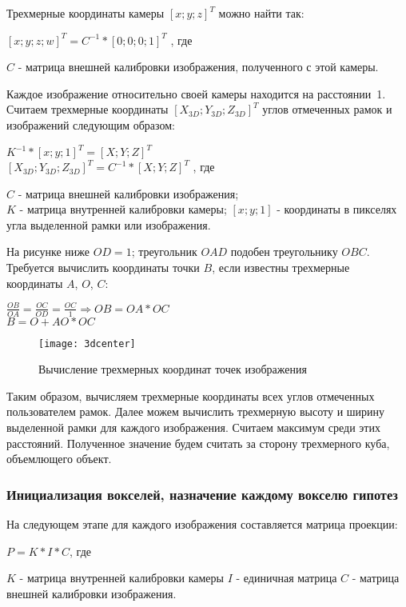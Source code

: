 Трехмерные координаты камеры $[x;y;z]^T$ можно найти так:

\begin{center}
	$[x;y;z;w]^T = C^{-1}*[0;0;0;1]^T$ , где
\end{center}
$C$ - матрица внешней калибровки изображения, полученного с этой камеры.

Каждое изображение относительно своей камеры находится на расстоянии~1. Считаем трехмерные координаты $[X_{3D};Y_{3D};Z_{3D}]^T$ углов отмеченных рамок и изображений следующим образом:

\begin{center}
	$K^{-1}*[x;y;1]^T = [X;Y;Z]^T$ \\
	$[X_{3D};Y_{3D};Z_{3D}]^T = C^{-1}*[X;Y;Z]^T$ , где
\end{center}
$C$ - матрица внешней калибровки изображения;\\
$K$ - матрица внутренней калибровки камеры;
$[x;y;1]$ - координаты в пикселях угла выделенной рамки или изображения.

На рисунке ниже $OD = 1$; треугольник ${OAD}$ подобен треугольнику ${OBC}$. Требуется вычислить координаты точки $B$, если известны трехмерные координаты $A$, $O$, $C$:

\begin{center}
	$\frac{OB}{OA} = \frac{OC}{OD} = \frac{OC}{1} \Rightarrow OB = OA*OC$ \\
	$B = O + AO*OC$
\end{center}

\begin{figure}[h]
\center
\texttt{[image: 3dcenter]}
\caption{Вычисление трехмерных координат точек изображения}
\end{figure}

Таким образом, вычисляем трехмерные координаты всех углов отмеченных пользователем рамок. Далее можем вычислить трехмерную высоту и ширину выделенной рамки для каждого изображения. Считаем максимум среди этих расстояний. Полученное значение будем считать за сторону трехмерного куба, объемлющего объект.

\subsubsection{Инициализация вокселей, назначение каждому вокселю гипотез}
На следующем этапе для каждого изображения составляется матрица проекции:

\begin{center}
	$P = K*I*C$, где
\end{center}
$K$ - матрица внутренней калибровки камеры
$I$ - единичная матрица
$C$ - матрица внешней калибровки изображения.

